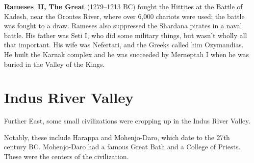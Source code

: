 \textbf{Rameses~II, The Great} (1279--1213 BC) fought the Hittites at the Battle of Kadesh,
near the Orontes River, where over 6,000 chariots were used;
the battle was fought to a draw.
Rameses also suppressed the Shardana pirates in a naval battle.
His father was Seti I, who did some military things, but wasn't wholly all that important.
His wife was Nefertari, and the Greeks called him Ozymandias.
He built the Karnak complex and he was succeeded by Merneptah I when he was buried in the Valley of the Kings.

\section{Indus River Valley}

Further East, some small civilizations were cropping up in the Indus River Valley.

Notably, these include Harappa and Mohenjo-Daro, which date to the 27th century BC\@.
Mohenjo-Daro had a famous Great Bath and a College of Priests.
These were the centers of the civilization.
